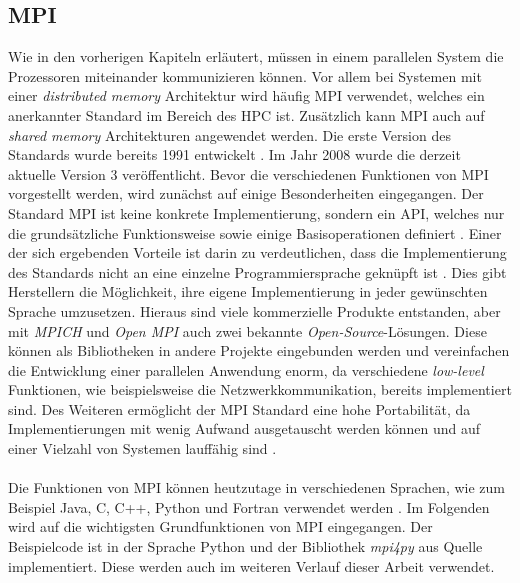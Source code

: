 \subsection{MPI}
\label{subsec:mpi}
Wie in den vorherigen Kapiteln erläutert, müssen in einem parallelen System die Prozessoren miteinander kommunizieren können. Vor allem bei Systemen mit einer \emph{distributed memory} Architektur wird häufig \ac{MPI} verwendet, welches ein anerkannter Standard im Bereich des \ac{HPC} ist. Zusätzlich kann \ac{MPI} auch auf \emph{shared memory} Architekturen angewendet werden. Die erste Version des Standards wurde bereits 1991 entwickelt \cite{nielsen2016introduction}. Im Jahr 2008 wurde die derzeit aktuelle Version 3 veröffentlicht. Bevor die verschiedenen Funktionen von \ac{MPI} vorgestellt werden, wird zunächst auf einige Besonderheiten eingegangen. Der Standard \ac{MPI} ist keine konkrete Implementierung, sondern ein \ac{API}, welches nur die grundsätzliche Funktionsweise sowie einige Basisoperationen definiert \cite{nielsen2016introduction}. Einer der sich ergebenden Vorteile ist darin zu verdeutlichen, dass die Implementierung des Standards nicht an eine einzelne Programmiersprache geknüpft ist \cite{nielsen2016introduction}. Dies gibt Herstellern die Möglichkeit, ihre eigene Implementierung in jeder gewünschten Sprache umzusetzen. Hieraus sind viele kommerzielle Produkte entstanden, aber mit \emph{MPICH} und \emph{Open MPI} auch zwei bekannte \emph{Open-Source}-Lösungen. Diese können als Bibliotheken in andere Projekte eingebunden werden und vereinfachen die Entwicklung einer parallelen Anwendung enorm, da verschiedene \emph{low-level} Funktionen, wie beispielsweise die Netzwerkkommunikation, bereits implementiert sind. Des Weiteren ermöglicht der \ac{MPI} Standard eine hohe Portabilität, da Implementierungen mit wenig Aufwand ausgetauscht werden können und auf einer Vielzahl von Systemen lauffähig sind \cite{dalcin2008mpi}.
\\\\
Die Funktionen von \ac{MPI} können heutzutage in verschiedenen Sprachen, wie zum Beispiel Java, C, C++, Python und Fortran verwendet werden \cite{nielsen2016introduction}. Im Folgenden wird auf die wichtigsten Grundfunktionen von \ac{MPI} eingegangen. Der Beispielcode ist in der Sprache Python und der Bibliothek \emph{mpi4py} aus Quelle \cite{dalcin2008mpi} implementiert. Diese werden auch im weiteren Verlauf dieser Arbeit verwendet.

